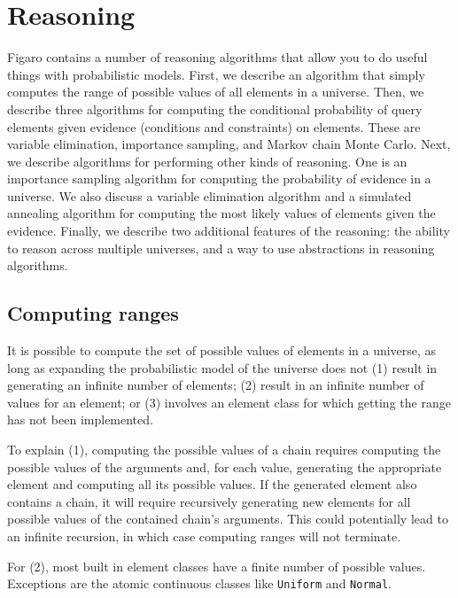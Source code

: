 
\chapter{Reasoning} %

\label{Reasoning} %

Figaro contains a number of reasoning algorithms that allow you to do useful things with probabilistic models. First, we describe an algorithm that simply computes the range of possible values of all elements in a universe. Then, we describe three algorithms for computing the conditional probability of query elements given evidence (conditions and constraints) on elements. These are variable elimination, importance sampling, and Markov chain Monte Carlo. Next, we describe algorithms for performing other kinds of reasoning. One is an importance sampling algorithm for computing the probability of evidence in a universe. We also discuss a variable elimination algorithm and a simulated annealing algorithm for computing the most likely values of elements given the evidence. Finally, we describe two additional features of the reasoning: the ability to reason across multiple universes, and a way to use abstractions in reasoning algorithms.

\section{Computing ranges}

It is possible to compute the set of possible values of elements in a universe, as long as expanding the probabilistic model of the universe does not (1) result in generating an infinite number of elements; (2) result in an infinite number of values for an element; or (3) involves an element class for which getting the range has not been implemented.

To explain (1), computing the possible values of a chain requires computing the possible values of the arguments and, for each value, generating the appropriate element and computing all its possible values. If the generated element also contains a chain, it will require recursively generating new elements for all possible values of the contained chain's arguments. This could potentially lead to an infinite recursion, in which case computing ranges will not terminate.

For (2), most built in element classes have a finite number of possible values. Exceptions are the atomic continuous classes like \texttt{Uniform} and \texttt{Normal}.

